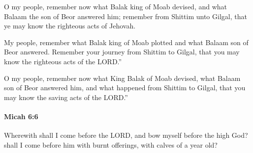 			\begin{versebox}
					\item[BHS] 
					\item[LXX] 
					\item[ASV] O my people, remember now what Balak king of Moab devised, and what Balaam the son of Beor answered him; remember from Shittim unto Gilgal, that ye may know the righteous acts of Jehovah.
					\item[NIV] My people, remember what Balak king of Moab plotted and what Balaam son of Beor answered. Remember your journey from Shittim to Gilgal, that you may know the righteous acts of the LORD.”
					\item[NRSV] O my people, remember now what King Balak of Moab devised, what Balaam son of Beor answered him, and what happened from Shittim to Gilgal, that you may know the saving acts of the LORD.”
			\end{versebox}

		\paragraph{Micah 6:6} %
			\label{MICAH-6-6}

			Wherewith shall I come before the LORD, and bow myself before the high God? shall I come before him with burnt offerings, with calves of a year old?

